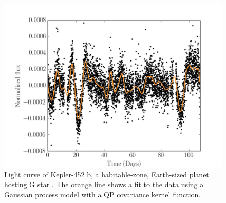 \begin{figure}
\begin{center}
\includegraphics[width=6in, clip=true]{figures/Kepler452b.pdf}
\caption{Light curve of Kepler-452 b, a habitable-zone, Earth-sized planet
hosting G star \citep{jenkins}. The orange line shows a fit to the data using
a Gaussian process model with a QP covariance kernel function.}
\label{fig:GP_example}
\end{center}
\end{figure}


% 

